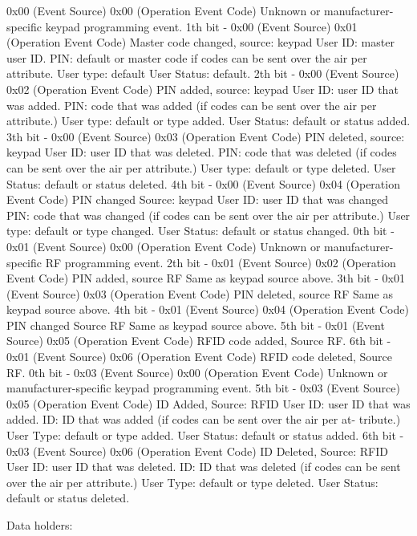0x00 (Event Source) 0x00 (Operation Event Code)  Unknown or manufacturer-specific keypad programming event. 1th bit - 0x00 (Event Source) 0x01 (Operation Event Code)  Master code changed, source: keypad User ID: master user ID. PIN: default or master code if codes can be sent over the air per attribute. User type: default User Status: default. 2th bit - 0x00 (Event Source) 0x02 (Operation Event Code)  PIN added, source: keypad User ID: user ID that was added. PIN: code that was added (if codes can be sent over the air per attribute.) User type: default or type added. User Status: default or status added. 3th bit - 0x00 (Event Source) 0x03 (Operation Event Code)  PIN deleted, source: keypad User ID: user ID that was deleted. PIN: code that was deleted (if codes can be sent over the air per attribute.) User type: default or type deleted. User Status: default or status deleted. 4th bit - 0x00 (Event Source) 0x04 (Operation Event Code)  PIN changed Source: keypad User ID: user ID that was changed PIN: code that was changed (if codes can be sent over the air per attribute.) User type: default or type changed. User Status: default or status changed. 0th bit - 0x01 (Event Source) 0x00 (Operation Event Code)  Unknown or manufacturer-specific RF programming event. 2th bit - 0x01 (Event Source) 0x02 (Operation Event Code)  PIN added, source RF Same as keypad source above. 3th bit - 0x01 (Event Source) 0x03 (Operation Event Code)  PIN deleted, source RF Same as keypad source above. 4th bit - 0x01 (Event Source) 0x04 (Operation Event Code)  PIN changed Source RF Same as keypad source above. 5th bit - 0x01 (Event Source) 0x05 (Operation Event Code)  RFID code added, Source RF. 6th bit - 0x01 (Event Source) 0x06 (Operation Event Code)  RFID code deleted, Source RF. 0th bit - 0x03 (Event Source) 0x00 (Operation Event Code)  Unknown or manufacturer-specific keypad programming event. 5th bit - 0x03 (Event Source) 0x05 (Operation Event Code)  ID Added, Source: RFID User ID: user ID that was added. ID: ID that was added (if codes can be sent over the air per at- tribute.) User Type: default or type added. User Status: default or status added. 6th bit - 0x03 (Event Source) 0x06 (Operation Event Code)  ID Deleted, Source: RFID User ID: user ID that was deleted. ID: ID that was deleted (if codes can be sent over the air per attribute.) User Type: default or type deleted. User Status: default or status deleted.
\newline

\noindent
Data holders:

